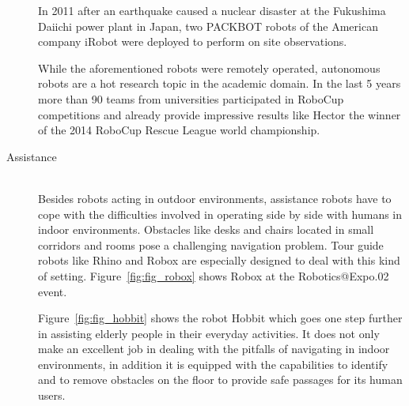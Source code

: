 \begin{description}
In 2011 after an earthquake caused a nuclear disaster at the Fukushima Daiichi power plant in Japan, two PACKBOT robots of the American company iRobot were deployed to perform on site observations.

While the aforementioned robots were remotely operated, autonomous robots are a hot research topic in the academic domain. In the last 5 years more than 90 teams from universities participated in RoboCup competitions and already provide impressive results like Hector \cite{2014:hector_rescue_tdp} the winner of the 2014 RoboCup Rescue League world championship.

\item[Assistance]\hfill \\
Besides robots acting in outdoor environments, assistance robots have to cope with the difficulties involved in operating side by side with humans in indoor environments. 
Obstacles like desks and chairs located in small corridors and rooms pose a challenging navigation problem.
Tour guide robots like Rhino \cite{DWA1997} and Robox \cite{philippsen:2004:phd} are especially designed to deal with this kind of setting.
Figure~\ref{fig:fig_robox} shows Robox at the Robotics@Expo.02 event. 

Figure~\ref{fig:fig_hobbit} shows the robot Hobbit \cite{fischinger2013hobbit}\cite{zagler2014roboter} which goes one step further in assisting elderly people in their everyday activities.
It does not only make an excellent job in dealing with the pitfalls of navigating in indoor environments, in addition it is equipped with the capabilities to identify and to remove obstacles on the floor to provide safe passages for its human users.


\end{description}
